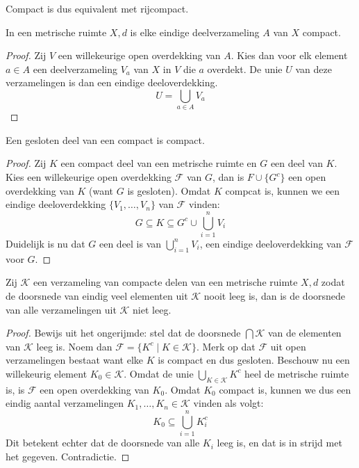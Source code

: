 \documentclass[main.tex]{subfiles}
\begin{document}
\begin{opm}
  Compact is dus equivalent met rijcompact.
\end{opm}

\begin{st}
  \label{st:eindig-dan-compact}
  In een metrische ruimte $X,d$ is elke eindige deelverzameling $A$ van $X$ compact.

  \begin{proof}
    Zij $V$ een willekeurige open overdekking van $A$.
    Kies dan voor elk element $a\in A$ een deelverzameling $V_{a}$ van $X$ in $V$ die $a$ overdekt.
    De unie $U$ van deze verzamelingen is dan een eindige deeloverdekking.
    \[ U = \bigcup_{a\in A}V_{a} \]
  \end{proof}
\end{st}

\begin{bpr}
  \label{pr:gesloten-deel-van-compact-is-compact}
  Een gesloten deel van een compact is compact.

  \begin{proof}
    Zij $K$ een compact deel van een metrische ruimte en $G$ een deel van $K$.
    Kies een willekeurige open overdekking $\mathcal{F}$ van $G$, dan is $F \cup \{G^{c}\}$ een open overdekking van $K$ (want $G$ is gesloten).
    Omdat $K$ compcat is, kunnen we een eindige deeloverdekking $\{V_{1},\dotsc,V_{n}\}$ van $\mathcal{F}$ vinden:
    \[ G \subseteq K \subseteq G^{c} \cup \bigcup_{i=1}^{n}V_{i} \]
    Duidelijk is nu dat $G$ een deel is van $\bigcup_{i=1}^{n}V_{i}$, een eindige deeloverdekking van $\mathcal{F}$ voor $G$.
  \end{proof}
\end{bpr}

\begin{bei}
  Zij $\mathcal{K}$ een verzameling van compacte delen van een metrische ruimte $X,d$ zodat de doorsnede van eindig veel elementen uit $\mathcal{K}$ nooit leeg is, dan is de doorsnede van alle verzamelingen uit $\mathcal{K}$ niet leeg.

  \begin{proof}
    Bewijs uit het ongerijmde: stel dat de doorsnede $\bigcap\mathcal{K}$ van de elementen van $\mathcal{K}$ leeg is.
    Noem dan $\mathcal{F} = \{K^{c}\mid K \in \mathcal{K}\}$.
    Merk op dat $\mathcal{F}$ uit open verzamelingen bestaat want elke $K$ is compact en dus gesloten.
    Beschouw nu een willekeurig element $K_{0} \in \mathcal{K}$.
    Omdat de unie $\bigcup_{K\in \mathcal{K}}K^{c}$ heel de metrische ruimte is, is $\mathcal{F}$ een open overdekking van $K_{0}$.
    Omdat $K_{0}$ compact is, kunnen we dus een eindig aantal verzamelingen $K_{1},\dotsc,K_{n} \in \mathcal{K}$ vinden als volgt:
    \[ K_{0} \subseteq \bigcup_{i=1}^{n}K_{i}^{c} \]
    Dit betekent echter dat de doorsnede van alle $K_{i}$ leeg is, en dat is in strijd met het gegeven.
    Contradictie.
  \end{proof}
\end{bei}
\end{document}
